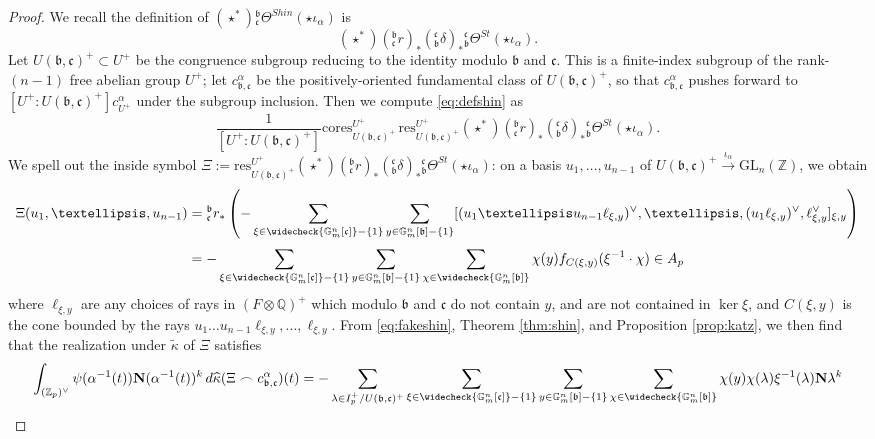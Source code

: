 \documentclass[10pt]{amsart}
\theoremstyle{definition}
\newcommand{\Z}{\mathbb{Z}}
\newcommand{\Q}{\mathbb{Q}}
\renewcommand{\c}{\mathfrak{c}}
\renewcommand{\b}{\mathfrak{b}}
\newcommand{\G}{\mathbb{G}}
\newcommand{\GL}{\mathrm{GL}}
\numberwithin{equation}{section}
\begin{document}
    \begin{proof}           
        We recall the definition of $(\star^*){}^\b_\c\Theta^{Shin}(\star \iota_\alpha)$ is
        \begin{equation} \label{eq:defshin}
            (\star^*)({}^\b_{\c}r)_*({}^\c_{\b}\delta)_* {}^\c_{\b}\Theta^{St}(\star \iota_\alpha).
        \end{equation}
       Let $U(\b,\c)^+\subset U^+$ be the congruence subgroup reducing to the identity modulo $\b$ and $\c$. This is a finite-index subgroup of the rank-$(n-1)$ free abelian group $U^+$; let $c_{\b,\c}^\alpha$ be the positively-oriented fundamental class of $U(\b,\c)^+$, so that $c_{\b,\c}^\alpha$ pushes forward to $[U^+:U(\b,\c)^+]c_{U^+}^\alpha$ under the subgroup inclusion. Then we compute \eqref{eq:defshin} as
       \begin{equation}
           \frac{1}{[U^+:U(\b,\c)^+]}\mathrm{cores}^{U^+}_{U(\b,\c)^+}\, \mathrm{res}^{U^+}_{U(\b,\c)^+} (\star^*)({}^\b_{\c}r)_*({}^\c_{\b}\delta)_* {}^\c_{\b}\Theta^{St}(\star \iota_\alpha).
       \end{equation}
        We spell out the inside symbol $\Xi:=\mathrm{res}^{U^+}_{U(\b,\c)^+} (\star^*)({}^\b_{\c}r)_*({}^\c_{\b}\delta)_* {}^\c_{\b}\Theta^{St}(\star \iota_\alpha)$: on a basis $u_1,\ldots, u_{n-1}$ of $U(\b,\c)^+\xrightarrow{\iota_\alpha} \GL_n(\Z)$, we obtain  
        \[
        \Xi(u_1,\ldots, u_{n-1})= {}^\b_{\c}r_*\left(-\sum_{\xi\in \widecheck{\G_m^n[\c]}-\{1\}} \sum_{y\in \G_m^n[\b]-\{1\}} [(u_1\ldots u_{n-1} \ell_{\xi, y})^\vee, \ldots, (u_1 \ell_{\xi, y})^\vee, \ell_{\xi,y}^\vee]_{\xi, y}\right)\]
        \[
        = -\sum_{\xi\in \widecheck{\G_m^n[\c]}-\{1\}} \sum_{y\in \G_m^n[\b]-\{1\}} \sum_{\chi\in \widecheck{\G_m^n[\b]}} \chi(y) f_{C(\xi,y)}(\xi^{-1}\cdot \chi)\in A_p
        \]
        where $\ell_{\xi,y}$ are any choices of rays in $(F\otimes \Q)^+$ which modulo $\b$ and $\c$ do not contain $y$, and are not contained in $\ker \xi$, and $C(\xi,y)$ is the cone bounded by the rays $u_1\ldots u_{n-1} \ell_{\xi, y}, \ldots, \ell_{\xi,y}$. From \eqref{eq:fakeshin}, Theorem \ref{thm:shin}, and Proposition \ref{prop:katz}, we then find that the realization under $\widetilde{\kappa}$ of $\Xi$ satisfies 
        \begin{align}
            \int_{(\Z_p)^\vee} \psi(\alpha^{-1}(t)) \mathbf{N}(\alpha^{-1}(t))^k\, d\widehat{\kappa}(\Xi \frown c_{\b,\c}^\alpha)(t) & =  - \sum_{\lambda \in I_p^+/U(\b,\c)^+} \sum_{\xi\in \widecheck{\G_m^n[\c]}-\{1\}} \sum_{y\in \G_m^n[\b]-\{1\}} \sum_{\chi\in \widecheck{\G_m^n[\b]}} \chi(y) \chi(\lambda)\xi^{-1}(\lambda)\mathbf{N}\lambda^k \\

\end{align}
\end{proof}
\end{document}
